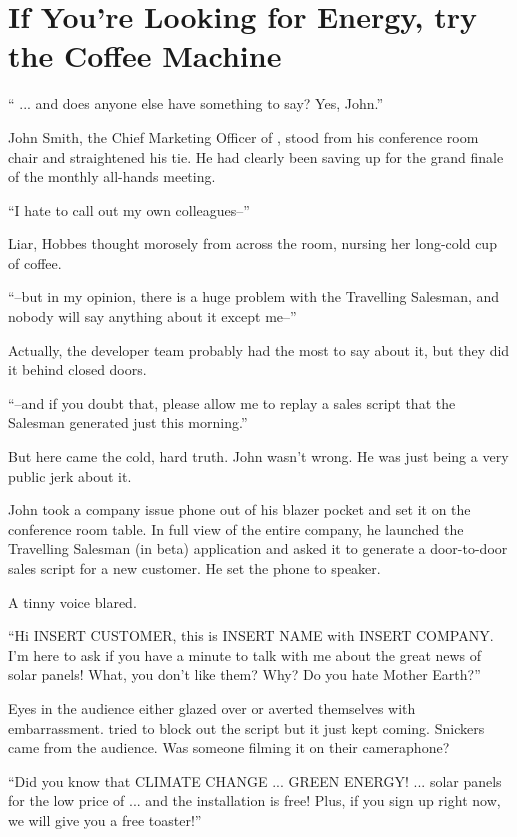 \chapter{If You're Looking for Energy, try the Coffee Machine}

`` ... and does anyone else have something to say? Yes, John.''

John Smith, the Chief Marketing Officer of \energyCompany{}, stood from his conference room chair and straightened his tie. He had clearly been saving up for the grand finale of the monthly all-hands meeting.

``I hate to call out my own colleagues--''

Liar, {\protag} Hobbes thought morosely from across the room, nursing her long-cold cup of coffee.

``--but in my opinion, there is a huge problem with the Travelling Salesman, and nobody will say anything about it except me--''

Actually, the developer team probably had the most to say about it, but they did it behind closed doors.

``--and if you doubt that, please allow me to replay a sales script that the Salesman generated just this morning.''

But here came the cold, hard truth. John wasn't wrong. He was just being a very public jerk about it.

John took a company issue phone out of his blazer pocket and set it on the conference room table. In full view of the entire company, he launched the Travelling Salesman (in beta) application and asked it to generate a door-to-door sales script for a new customer. He set the phone to speaker.

A tinny voice blared.

``Hi INSERT CUSTOMER, this is INSERT NAME with INSERT COMPANY. I'm here to ask if you have a minute to talk with me about the great news of solar panels! What, you don't like them? Why? Do you hate Mother Earth?''

Eyes in the audience either glazed over or averted themselves with embarrassment. {\protag} tried to block out the script but it just kept coming. Snickers came from the audience. Was someone filming it on their cameraphone?

``Did you know that CLIMATE CHANGE ... GREEN ENERGY! ... solar panels for the low price of ... and the installation is free! Plus, if you sign up right now, we will give you a free toaster!''

